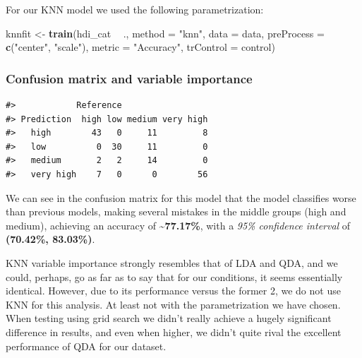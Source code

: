 \documentclass[]{article}
\newenvironment{Shaded}{\begin{snugshade}}{\end{snugshade}}
\newcommand{\DataTypeTok}[1]{\textcolor[rgb]{0.13,0.29,0.53}{#1}}
\newcommand{\KeywordTok}[1]{\textcolor[rgb]{0.13,0.29,0.53}{\textbf{#1}}}
\newcommand{\NormalTok}[1]{#1}
\newcommand{\OperatorTok}[1]{\textcolor[rgb]{0.81,0.36,0.00}{\textbf{#1}}}
\newcommand{\StringTok}[1]{\textcolor[rgb]{0.31,0.60,0.02}{#1}}
\begin{document}
For our KNN model we used the following parametrization:

\footnotesize

\begin{Shaded}
\begin{Highlighting}[]
\NormalTok{knnfit <-}\StringTok{ }\KeywordTok{train}\NormalTok{(hdi_cat }\OperatorTok{~}\StringTok{ }\NormalTok{., }\DataTypeTok{method =} \StringTok{"knn"}\NormalTok{, }\DataTypeTok{data =}\NormalTok{ data, }\DataTypeTok{preProcess =} \KeywordTok{c}\NormalTok{(}\StringTok{"center"}\NormalTok{, }\StringTok{"scale"}\NormalTok{),}
                \DataTypeTok{metric =} \StringTok{"Accuracy"}\NormalTok{, }\DataTypeTok{trControl =}\NormalTok{ control)}
\end{Highlighting}
\end{Shaded}

\normalsize

\hypertarget{confusion-matrix-and-variable-importance-3}{%
\subsubsection{Confusion matrix and variable
importance}\label{confusion-matrix-and-variable-importance-3}}

\footnotesize

\begin{verbatim}
#>            Reference
#> Prediction  high low medium very high
#>   high        43   0     11         8
#>   low          0  30     11         0
#>   medium       2   2     14         0
#>   very high    7   0      0        56
\end{verbatim}

\normalsize

We can see in the confusion matrix for this model that the model
classifies worse than previous models, making several mistakes in the
middle groups (high and medium), achieving an accuracy of
\textbf{\textasciitilde{}77.17\%}, with a \emph{95\% confidence
interval} of \textbf{(70.42\%, 83.03\%)}.

KNN variable importance strongly resembles that of LDA and QDA, and we
could, perhaps, go as far as to say that for our conditions, it seems
essentially identical. However, due to its performance versus the former
2, we do not use KNN for this analysis. At least not with the
parametrization we have chosen. When testing using grid search we didn't
really achieve a hugely significant difference in results, and even when
higher, we didn't quite rival the excellent performance of QDA for our
dataset.
\end{document}
